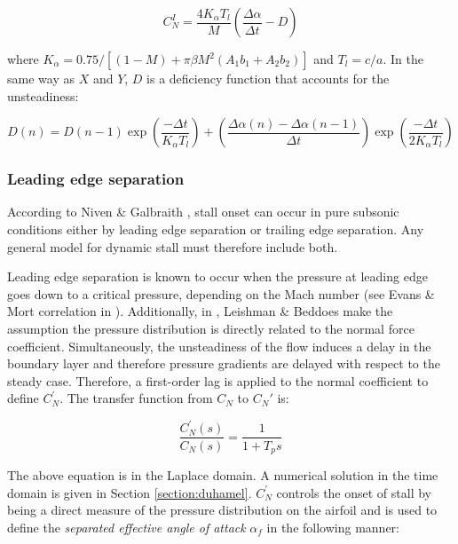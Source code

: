 \begin{equation}
C_{N}^{I}=\frac{4 K_{\alpha} T_{l}}{M}\left(\frac{\Delta \alpha}{\Delta t}-D\right)
\label{eq:impulsive}
\end{equation}

\noindent where $K_\alpha=0.75/[(1-M)+\pi \beta M^2(A_1 b_1 + A_2 b_2)]$ and $T_l=c/a$. In the same way as $X$ and $Y$, $D$ is a deficiency function that accounts for the unsteadiness:  

\begin{equation}
	D(n) = D(n-1) \exp \left(\frac{-\Delta t}{K_\alpha T_l}\right) + \left(\frac{\Delta \alpha(n) - \Delta \alpha (n-1)}{\Delta t} \right) \exp \left(\frac{-\Delta t}{2 K_\alpha T_l} \right)
\end{equation}

\subsubsection{Leading edge separation}

According to Niven \& Galbraith \cite{niven_modelling_1997}, stall onset can occur in pure subsonic conditions either by leading edge separation or trailing edge separation. Any general model for dynamic stall must therefore include both. 

Leading edge separation is known to occur when the pressure at leading edge goes down to a critical pressure, depending on the Mach number (see Evans \& Mort correlation in \cite{sheng_new_2006}). Additionally, in \cite{leishman_semi-empirical_1989}, Leishman \& Beddoes make the assumption the pressure distribution is directly related to the normal force coefficient. Simultaneously, the unsteadiness of the flow induces a delay in the boundary layer and therefore pressure gradients are delayed with respect to the steady case. Therefore, a first-order lag is applied to the normal coefficient to define $C_N^{\prime}$. The transfer function from $C_N$ to $C_N'$ is: 

\begin{equation}
\frac{C_N^{\prime}(s)}{C_N(s)} = \frac{1}{1+T_p s}
\label{eq:cnprime_laplace}  
\end{equation}

The above equation is in the Laplace domain. A numerical solution in the time domain is given in Section \ref{section:duhamel}. $C_N^{\prime}$ controls the onset of stall by being a direct measure of the pressure distribution on the airfoil and is used to define the \textit{separated effective angle of attack} $\alpha_f$ in the following manner:

